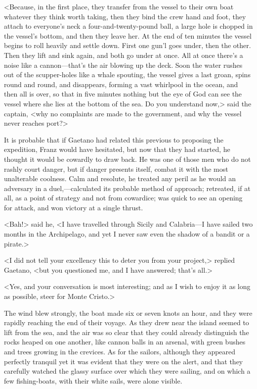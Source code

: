  <Because, in the first place, they transfer from the vessel to their own boat whatever they think worth taking, then they bind the crew hand and foot, they attach to everyone's neck a four-and-twenty-pound ball, a large hole is chopped in the vessel's bottom, and then they leave her. At the end of ten minutes the vessel begins to roll heavily and settle down. First one gun'l goes under, then the other. Then they lift and sink again, and both go under at once. All at once there's a noise like a cannon—that's the air blowing up the deck. Soon the water rushes out of the scupper-holes like a whale spouting, the vessel gives a last groan, spins round and round, and disappears, forming a vast whirlpool in the ocean, and then all is over, so that in five minutes nothing but the eye of God can see the vessel where she lies at the bottom of the sea. Do you understand now,> said the captain, <why no complaints are made to the government, and why the vessel never reaches port?> 

 It is probable that if Gaetano had related this previous to proposing the expedition, Franz would have hesitated, but now that they had started, he thought it would be cowardly to draw back. He was one of those men who do not rashly court danger, but if danger presents itself, combat it with the most unalterable coolness. Calm and resolute, he treated any peril as he would an adversary in a duel,—calculated its probable method of approach; retreated, if at all, as a point of strategy and not from cowardice; was quick to see an opening for attack, and won victory at a single thrust. 

 <Bah!> said he, <I have travelled through Sicily and Calabria—I have sailed two months in the Archipelago, and yet I never saw even the shadow of a bandit or a pirate.> 

 <I did not tell your excellency this to deter you from your project,> replied Gaetano, <but you questioned me, and I have answered; that's all.> 

 <Yes, and your conversation is most interesting; and as I wish to enjoy it as long as possible, steer for Monte Cristo.> 

 The wind blew strongly, the boat made six or seven knots an hour, and they were rapidly reaching the end of their voyage. As they drew near the island seemed to lift from the sea, and the air was so clear that they could already distinguish the rocks heaped on one another, like cannon balls in an arsenal, with green bushes and trees growing in the crevices. As for the sailors, although they appeared perfectly tranquil yet it was evident that they were on the alert, and that they carefully watched the glassy surface over which they were sailing, and on which a few fishing-boats, with their white sails, were alone visible. 

